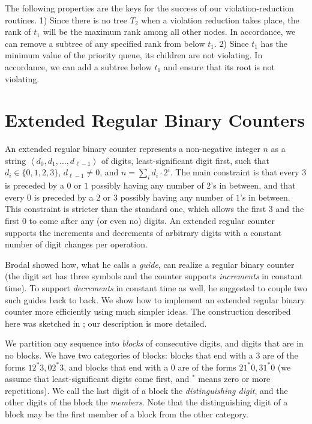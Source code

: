\documentclass{llncs}
\newcommand{\sequence}[1]{\left\langle#1\right\rangle}
\begin{document}
The following properties are the keys for the success of our violation-reduction routines.
1) Since there is no tree $T_2$ when a violation reduction takes place, 
the rank of $t_1$ will be the maximum rank among all other nodes. 
In accordance, we can remove a subtree of any specified rank from below $t_1$.
2) Since $t_1$ has the minimum value of the priority queue, its children 
are not violating. In accordance, we can add a subtree below $t_1$ and ensure that
its root is not violating.
   

\section{Extended Regular Binary Counters}

An extended regular binary counter represents a non-negative integer
$n$ as a string $\sequence{d_0,d_1,\ldots,d_{\ell-1}}$ of digits,
least-sig\-nifi\-cant digit first, such that $d_i \in \{0,1,2,3\}$,
$d_{\ell-1} \neq 0$, and $n =\sum _i d_i \cdot 2^i$.  The main
constraint is that every $3$ is preceded by a $0$ or $1$ possibly
having any number of $2$'s in between, and that every $0$ is preceded
by a $2$ or $3$ possibly having any number of $1$'s in between.  This
constraint is stricter than the standard one, which allows the first
$3$ and the first $0$ to come after any (or even no) digits.  An
extended regular counter \cite{CK77,KST02} supports the increments and
decrements of arbitrary digits with a constant number of digit changes
per operation.

Brodal \cite{Bro96} showed how, what he calls a \emph{guide},
can realize a regular binary counter (the digit set has three symbols
and the counter supports {\it increments} in constant time).  To support
{\it decrements} in constant time as well, he suggested to couple two such
guides back to back.  We show how to implement an extended regular
binary counter more efficiently using much simpler ideas. The
construction described here was sketched in \cite{KST02}; our
description is more detailed.

We partition any sequence into \emph{blocks} of consecutive digits,
and digits that are in no blocks.  We have two categories of blocks:
blocks that end with a $3$ are of the forms $12^*3, 02^*3$, and blocks
that end with a $0$ are of the forms $21^*0, 31^*0$ (we assume that
least-significant digits come first, and $^{*}$ means zero or more
repetitions).  We call the last digit of a block the
\emph{distinguishing digit}, and the other digits of the block the
\emph{members}.  Note that the distinguishing digit of a block may be
the first member of a block from the other category.
\end{document}
